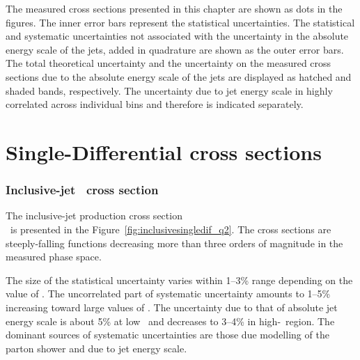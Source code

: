 The measured cross sections presented in this chapter are shown as dots in the figures. The inner error bars represent the statistical uncertainties. The statistical and systematic uncertainties not associated with the uncertainty in the absolute energy scale of the jets, added in quadrature are shown as the outer error bars. The total theoretical uncertainty and the uncertainty on the measured cross sections due to the absolute energy scale of the jets are displayed as hatched and shaded bands, respectively. The uncertainty due to jet energy scale in highly correlated across individual bins and therefore is indicated separately.

\section{Single-Differential cross sections}
\subsubsection*{Inclusive-jet \dsdqsq~cross section}
The inclusive-jet production cross section\\ \dsdetjetb~is presented in the Figure~\ref{fig:inclusivesingledif_q2}. The cross sections are steeply-falling functions decreasing more than three orders of magnitude in the measured phase space.

The size of the statistical uncertainty varies within 1--3\% range depending on the value of \qsq. The uncorrelated part of systematic uncertainty amounts to 1--5\% increasing toward large values of \qsq. The uncertainty due to that of absolute jet energy scale is about 5\% at low \qsq~and decreases to 3--4\% in high-\qsq~region. The dominant sources of systematic uncertainties are those due modelling of the parton shower and due to jet energy scale.

